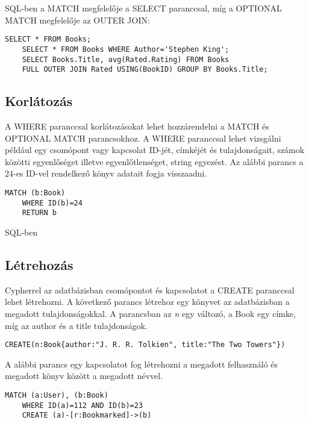 \noindent SQL-ben a MATCH megfelelője a SELECT paranccsal, míg a OPTIONAL MATCH megfelelője az OUTER JOIN:

\begin{lstlisting}[columns=fullflexible]
    SELECT * FROM Books;
    SELECT * FROM Books WHERE Author='Stephen King';
    SELECT Books.Title, avg(Rated.Rating) FROM Books 
    FULL OUTER JOIN Rated USING(BookID) GROUP BY Books.Title;
\end{lstlisting}

\subsection{Korlátozás}
A WHERE paranccsal korlátozásokat lehet hozzárendelni a MATCH és OPTIONAL MATCH parancsokhoz. A WHERE paranccsal lehet vizsgálni például egy csomópont vagy kapcsolat ID-jét, címkéjét és tulajdonságait, számok közötti egyenlőséget illetve egyenlőtlenséget, string egyezést. Az alábbi parancs a 24-es ID-vel rendelkező könyv adatait fogja visszaadni.

\begin{lstlisting}[columns=fullflexible]
    MATCH (b:Book) 
    WHERE ID(b)=24
    RETURN b
\end{lstlisting}

\noindent SQL-ben

\subsection{Létrehozás}
Cypherrel az adatbázisban csomópontot és kapcsolatot a CREATE paranccsal lehet létrehozni. A következő parancs létrehoz egy könyvet az adatbázisban a megadott tulajdonságokkal. A parancsban az \textit{n} egy változó, a Book egy címke, míg az author és a title tulajdonságok. 
\begin{lstlisting}[columns=fullflexible]
    CREATE(n:Book{author:"J. R. R. Tolkien", title:"The Two Towers"})
\end{lstlisting}

\bigskip

\noindent A alábbi parancs egy kapcsolatot fog létrehozni a megadott felhasználó és megadott könyv között a megadott névvel.

\begin{lstlisting}[columns=fullflexible]
    MATCH (a:User), (b:Book) 
    WHERE ID(a)=112 AND ID(b)=23
    CREATE (a)-[r:Bookmarked]->(b) 
\end{lstlisting}

